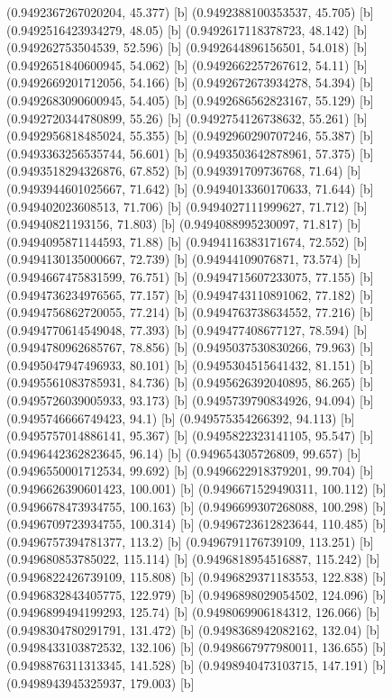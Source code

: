 {{{(0.9492367267020204, 45.377) [b] 
(0.9492388100353537, 45.705) [b] 
(0.9492516423934279, 48.05) [b] 
(0.9492617118378723, 48.142) [b] 
(0.949262753504539, 52.596) [b] 
(0.9492644896156501, 54.018) [b] 
(0.9492651840600945, 54.062) [b] 
(0.9492662257267612, 54.11) [b] 
(0.9492669201712056, 54.166) [b] 
(0.9492672673934278, 54.394) [b] 
(0.9492683090600945, 54.405) [b] 
(0.9492686562823167, 55.129) [b] 
(0.9492720344780899, 55.26) [b] 
(0.9492754126738632, 55.261) [b] 
(0.9492956818485024, 55.355) [b] 
(0.9492960290707246, 55.387) [b] 
(0.9493363256535744, 56.601) [b] 
(0.9493503642878961, 57.375) [b] 
(0.9493518294326876, 67.852) [b] 
(0.949391709736768, 71.64) [b] 
(0.9493944601025667, 71.642) [b] 
(0.9494013360170633, 71.644) [b] 
(0.949402023608513, 71.706) [b] 
(0.9494027111999627, 71.712) [b] 
(0.94940821193156, 71.803) [b] 
(0.9494088995230097, 71.817) [b] 
(0.9494095871144593, 71.88) [b] 
(0.9494116383171674, 72.552) [b] 
(0.9494130135000667, 72.739) [b] 
(0.94944109076871, 73.574) [b] 
(0.9494667475831599, 76.751) [b] 
(0.9494715607233075, 77.155) [b] 
(0.9494736234976565, 77.157) [b] 
(0.9494743110891062, 77.182) [b] 
(0.9494756862720055, 77.214) [b] 
(0.9494763738634552, 77.216) [b] 
(0.9494770614549048, 77.393) [b] 
(0.949477408677127, 78.594) [b] 
(0.9494780962685767, 78.856) [b] 
(0.9495037530830266, 79.963) [b] 
(0.9495047947496933, 80.101) [b] 
(0.9495304515641432, 81.151) [b] 
(0.9495561083785931, 84.736) [b] 
(0.9495626392040895, 86.265) [b] 
(0.9495726039005933, 93.173) [b] 
(0.9495739790834926, 94.094) [b] 
(0.9495746666749423, 94.1) [b] 
(0.949575354266392, 94.113) [b] 
(0.9495757014886141, 95.367) [b] 
(0.9495822323141105, 95.547) [b] 
(0.9496442362823645, 96.14) [b] 
(0.949654305726809, 99.657) [b] 
(0.9496550001712534, 99.692) [b] 
(0.9496622918379201, 99.704) [b] 
(0.9496626390601423, 100.001) [b] 
(0.9496671529490311, 100.112) [b] 
(0.9496678473934755, 100.163) [b] 
(0.9496699307268088, 100.298) [b] 
(0.9496709723934755, 100.314) [b] 
(0.9496723612823644, 110.485) [b] 
(0.9496757394781377, 113.2) [b] 
(0.9496791176739109, 113.251) [b] 
(0.949680853785022, 115.114) [b] 
(0.9496818954516887, 115.242) [b] 
(0.9496822426739109, 115.808) [b] 
(0.9496829371183553, 122.838) [b] 
(0.9496832843405775, 122.979) [b] 
(0.9496898029054502, 124.096) [b] 
(0.9496899494199293, 125.74) [b] 
(0.9498069906184312, 126.066) [b] 
(0.9498304780291791, 131.472) [b] 
(0.9498368942082162, 132.04) [b] 
(0.9498433103872532, 132.106) [b] 
(0.9498667977980011, 136.655) [b] 
(0.9498876311313345, 141.528) [b] 
(0.9498940473103715, 147.191) [b] 
(0.9498943945325937, 179.003) [b] 
}}}
